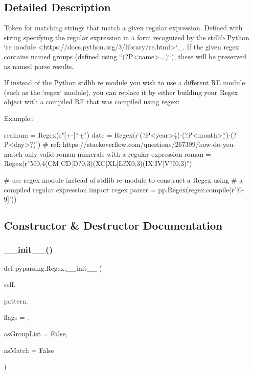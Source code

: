 \subsection{Detailed Description}
\begin{DoxyVerb}Token for matching strings that match a given regular
expression. Defined with string specifying the regular expression in
a form recognized by the stdlib Python  `re module <https://docs.python.org/3/library/re.html>`_.
If the given regex contains named groups (defined using ``(?P<name>...)``),
these will be preserved as named parse results.

If instead of the Python stdlib re module you wish to use a different RE module
(such as the `regex` module), you can replace it by either building your
Regex object with a compiled RE that was compiled using regex:

Example::

    realnum = Regex(r"[+-]?\d+\.\d*")
    date = Regex(r'(?P<year>\d{4})-(?P<month>\d\d?)-(?P<day>\d\d?)')
    # ref: https://stackoverflow.com/questions/267399/how-do-you-match-only-valid-roman-numerals-with-a-regular-expression
    roman = Regex(r"M{0,4}(CM|CD|D?{0,3})(XC|XL|L?X{0,3})(IX|IV|V?I{0,3})")

    # use regex module instead of stdlib re module to construct a Regex using
    # a compiled regular expression
    import regex
    parser = pp.Regex(regex.compile(r'[0-9]'))\end{DoxyVerb}
 

\subsection{Constructor \& Destructor Documentation}
\mbox{\label{classpyparsing_1_1Regex_ac3a7dea3a71304b85281af75207c42cf}} 
\subsubsection{\texorpdfstring{\+\_\+\+\_\+init\+\_\+\+\_\+()}{\_\_init\_\_()}}
{\footnotesize\ttfamily def pyparsing.\+Regex.\+\_\+\+\_\+init\+\_\+\+\_\+ (\begin{DoxyParamCaption}\item[{}]{self,  }\item[{}]{pattern,  }\item[{}]{flags = {},  }\item[{}]{as\+Group\+List = {\ttfamily False},  }\item[{}]{as\+Match = {\ttfamily False} }\end{DoxyParamCaption})}

